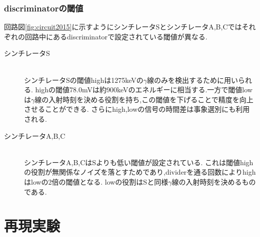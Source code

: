 \subsubsection{discriminatorの閾値}
回路図\ref{fig:circuit2015}に示すようにシンチレータSとシンチレータA,B,Cではそれぞれの回路中にあるdiscriminatorで設定されている閾値が異なる.
\begin{description}
	\item[シンチレータS]\mbox{}\\
		シンチレータSの閾値highは1275keVの$\gamma$線のみを検出するために用いられる.
		highの閾値78.0mVは約900keVのエネルギーに相当する.一方で閾値lowは$\gamma$線の入射時刻を決める役割を持ち,この閾値を下げることで精度を向上させることができる.
		さらにhigh,lowの信号の時間差は事象選別にも利用される.
	\item[シンチレータA,B,C]\mbox{}\\
		シンチレータA,B,CはSよりも低い閾値が設定されている.
		これは閾値highの役割が無関係なノイズを落とすためであり,dividerを通る回数によりhighはlowの2倍の閾値となる.
		lowの役割はSと同様$\gamma$線の入射時刻を決めるものである.
\end{description}


\section{再現実験}

